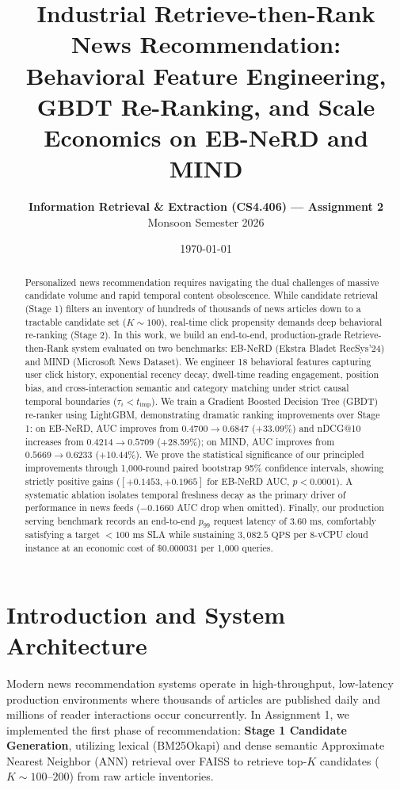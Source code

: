 \documentclass[11pt,a4paper]{article}
\title{\vspace{-2.0em}\textbf{Industrial Retrieve-then-Rank News Recommendation:\\ Behavioral Feature Engineering, GBDT Re-Ranking, and Scale Economics on EB-NeRD and MIND}\vspace{-0.7em}}
\author{
    \textbf{Information Retrieval \& Extraction (CS4.406) --- Assignment 2}\\
    Monsoon Semester 2026
}
\date{\vspace{-0.5em}\today\vspace{-0.8em}}
\begin{document}
\maketitle

\begin{abstract}
Personalized news recommendation requires navigating the dual challenges of massive candidate volume and rapid temporal content obsolescence. While candidate retrieval (Stage 1) filters an inventory of hundreds of thousands of news articles down to a tractable candidate set ($K \sim 100$), real-time click propensity demands deep behavioral re-ranking (Stage 2). In this work, we build an end-to-end, production-grade Retrieve-then-Rank system evaluated on two benchmarks: EB-NeRD (Ekstra Bladet RecSys'24) and MIND (Microsoft News Dataset). 
We engineer 18 behavioral features capturing user click history, exponential recency decay, dwell-time reading engagement, position bias, and cross-interaction semantic and category matching under strict causal temporal boundaries ($\tau_i < t_{\text{imp}}$). 
We train a Gradient Boosted Decision Tree (GBDT) re-ranker using LightGBM, demonstrating dramatic ranking improvements over Stage 1: on EB-NeRD, AUC improves from $0.4700 \to 0.6847$ (+33.09\%) and nDCG@10 increases from $0.4214 \to 0.5709$ (+28.59\%); on MIND, AUC improves from $0.5669 \to 0.6233$ (+10.44\%). 
We prove the statistical significance of our principled improvements through 1,000-round paired bootstrap 95\% confidence intervals, showing strictly positive gains ($[+0.1453, +0.1965]$ for EB-NeRD AUC, $p < 0.0001$). A systematic ablation isolates temporal freshness decay as the primary driver of performance in news feeds ($-0.1660$ AUC drop when omitted). 
Finally, our production serving benchmark records an end-to-end $p_{99}$ request latency of $3.60\text{ ms}$, comfortably satisfying a target $<100\text{ ms}$ SLA while sustaining $3,082.5\text{ QPS}$ per 8-vCPU cloud instance at an economic cost of $\$0.000031$ per 1,000 queries.
\end{abstract}

\section{Introduction and System Architecture}

Modern news recommendation systems operate in high-throughput, low-latency production environments where thousands of articles are published daily and millions of reader interactions occur concurrently. In Assignment 1, we implemented the first phase of recommendation: \textbf{Stage 1 Candidate Generation}, utilizing lexical (BM25Okapi) and dense semantic Approximate Nearest Neighbor (ANN) retrieval over FAISS to retrieve top-$K$ candidates ($K \sim 100\text{--}200$) from raw article inventories.
\end{document}

